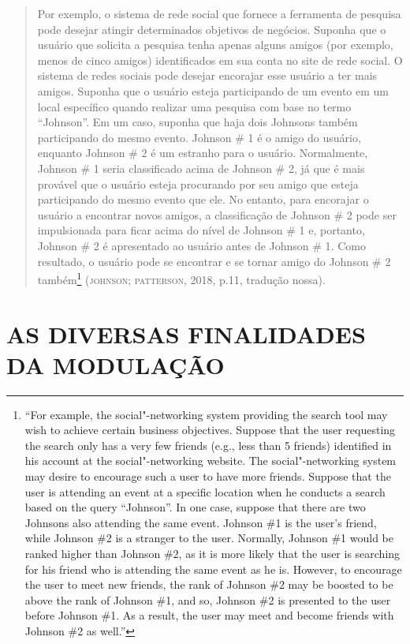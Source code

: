\begin{quote}
Por exemplo, o sistema de rede social que fornece a ferramenta de
pesquisa pode desejar atingir determinados objetivos de negócios.
Suponha que o usuário que solicita a pesquisa tenha apenas alguns amigos
(por exemplo, menos de cinco amigos) identificados em sua conta no site
de rede social. O sistema de redes sociais pode desejar encorajar esse
usuário a ter mais amigos. Suponha que o usuário esteja participando de
um evento em um local específico quando realizar uma pesquisa com base
no termo ``Johnson''. Em um caso, suponha que haja dois Johnsons também
participando do mesmo evento. Johnson \# 1 é o amigo do usuário,
enquanto Johnson \# 2 é um estranho para o usuário. Normalmente, Johnson
\# 1 seria classificado acima de Johnson \# 2, já que é mais provável
que o usuário esteja procurando por seu amigo que esteja participando do
mesmo evento que ele. No entanto, para encorajar o usuário a encontrar
novos amigos, a classificação de Johnson \# 2 pode ser impulsionada para
ficar acima do nível de Johnson \# 1 e, portanto, Johnson \# 2 é
apresentado ao usuário antes de Johnson \# 1. Como resultado, o usuário
pode se encontrar e se tornar amigo do Johnson \# 2 também\footnote{``For
  example, the social"-networking system providing the search tool may
  wish to achieve certain business objectives. Suppose that the user
  requesting the search only has a very few friends (e.g., less than 5
  friends) identified in his account at the social"-networking website.
  The social"-networking system may desire to encourage such a user to
  have more friends. Suppose that the user is attending an event at a
  specific location when he conducts a search based on the query
  ``Johnson''. In one case, suppose that there are two Johnsons also
  attending the same event. Johnson \#1 is the user's friend, while
  Johnson \#2 is a stranger to the user. Normally, Johnson \#1 would be
  ranked higher than Johnson \#2, as it is more likely that the user is
  searching for his friend who is attending the same event as he is.
  However, to encourage the user to meet new friends, the rank of
  Johnson \#2 may be boosted to be above the rank of Johnson \#1, and
  so, Johnson \#2 is presented to the user before Johnson \#1. As a
  result, the user may meet and become friends with Johnson \#2 as
  well.''} (\textsc{johnson}; \textsc{patterson}, 2018, p.11, tradução nossa).
\end{quote}

\section{AS DIVERSAS FINALIDADES DA MODULAÇÃO}

